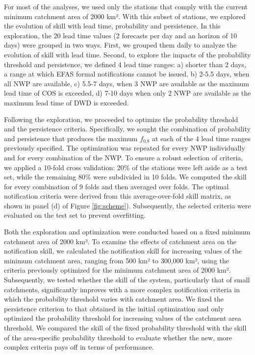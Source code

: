 \documentclass[preprint,12pt,authoryear]{elsarticle}
\begin{document}
For most of the analyses, we used only the stations that comply with the current minimum catchment area of 2000 km². With this subset of stations, we explored the evolution of skill with lead time, probability and persistence. In this exploration, the 20 lead time values (2 forecasts per day and an horizon of 10 days) were grouped in two ways. First, we grouped them daily to analyze the evolution of skill with lead time. Second, to explore the impacts of the probability threshold and persistence, we defined 4 lead time ranges: a) shorter than 2 days, a range at which EFAS formal notifications cannot be issued, b) 2-5.5 days, when all NWP are available, c) 5.5-7 days, when 3 NWP are available as the maximum lead time of COS is exceeded, d) 7-10 days when only 2 NWP are available as the maximum lead time of DWD is exceeded.

Following the exploration, we proceeded to optimize the probability threshold and the persistence criteria. Specifically, we sought the combination of probability and persistence that produces the maximum $f_{0.8}$ at each of the 4 lead time ranges previously specified. The optimization was repeated for every NWP individually and for every combination of the NWP. To ensure a robust selection of criteria, we applied a 10-fold cross validation: 20\% of the stations were left aside as a test set, while the remaining 80\% were subdivided in 10 folds. We computed the skill for every combination of 9 folds and then averaged over folds. The optimal notification criteria were derived from this average-over-fold skill matrix, as shown in panel (d) of Figure \ref{fig:scheme}). Subsequently, the selected criteria were evaluated on the test set to prevent overfitting. 

Both the exploration and optimization were conducted based on a fixed minimum catchment area of 2000 km². To examine the effects of catchment area on the notification skill, we calculated the notification skill for increasing values of the minimum catchment area, ranging from 500 km² to 300,000 km², using the criteria previously optimized for the minimum catchment area of 2000 km². Subsequently, we tested whether the skill of the system, particularly that of small catchments, significantly improves with a more complex notification criteria in which the probability threshold varies with catchment area. We fixed the persistence criterion to that obtained in the initial optimization and only optimized the probability threshold for increasing values of the catchment area threshold. We compared the skill of the fixed probability threshold with the skill of the area-specific probability threshold to evaluate whether the new, more complex criteria pays off in terms of performance.
\end{document}
